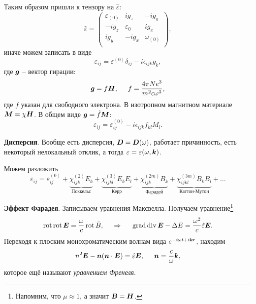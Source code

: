 Таким образом пришли к тензору на $\hat{\varepsilon}$:
\begin{equation*}
    \hat{\varepsilon} = \begin{pmatrix}
        \varepsilon_{(0)}  & i g_z & -i g_y \\
        -i g_z & \varepsilon_0 & i g_x \\
        i g_y & - i g_x & \omega_{(0)} \\
    \end{pmatrix},
\end{equation*}
иначе можем записать в виде
\begin{equation*}
    \varepsilon_{ij} = \varepsilon^{(0)} \delta_{ij} -i \epsilon_{ijk} g_k,
\end{equation*}
где $\mbox{\boldmath $g$}$ -- вектор гирации:
\begin{equation*}
    \mbox{\boldmath $g$} = f \mbox{\boldmath $H$},
    \hspace{5 mm} 
    f = \frac{4 \pi N e^3}{m^2 c \omega^3},
\end{equation*}
где $f$ указан для свободного электрона. 
В изотропном магнитном материале $\mbox{\boldmath $M$} = \chi \mbox{\boldmath $H$}$.
В общем виде $\mbox{\boldmath $g$} = \hat{f} \mbox{\boldmath $M$}$:
\begin{equation*}
    \varepsilon_{ij} = \varepsilon_{ij}^{(0)} - i \epsilon_{ijk} f_{kl} M_l.
\end{equation*}

\textbf{Дисперсия}. Вообще есть дисперсия, $\mbox{\boldmath $D$} = \mbox{\boldmath $D$}(\omega)$, работает причинность, есть некоторый нелокальный отклик, а тогда
$\varepsilon = \varepsilon(\omega, \mbox{\boldmath $k$})$. 

Можем разложить
\begin{equation*}
    \varepsilon_{ij} = 
    \varepsilon_{ij}^{(0)} + 
    \underbrace{\chi_{ijk}^{(2)} E_k}_{\text{Поккельс}} +
    \underbrace{\chi^{(3)}_{ijkl} E_k E_l}_{\text{Керр}} + 
    \underbrace{\chi^{(2m)}_{ijk} B_k}_{\text{Фарадей}} + 
    \underbrace{\chi_{ijkl}^{(3m)} B_k B_l}_{\text{Каттон-Мутон}} + \ldots
\end{equation*}








\textbf{Эффект Фарадея}. Записываем уравнения Максвелла. Получаем уравнение\footnote{
    Напомним, что $\mu \approx 1$, а значит $\mbox{\boldmath $B$} = \mbox{\boldmath $H$}$.
}
\begin{equation*}
\mathop{\mathrm{rot}}\nolimits \mathop{\mathrm{rot}}\nolimits \mbox{\boldmath $E$} = \frac{\omega}{c} \mathop{\mathrm{rot}}\nolimits \bar{B},
\hspace{0.5cm} \Rightarrow \hspace{0.5cm}
    \mathop{\mathrm{grad}}\nolimits \mathop{\mathrm{div}}\nolimits \mbox{\boldmath $E$} - \Delta E = \frac{\omega^2}{c} \hat{\varepsilon} \mbox{\boldmath $E$}.
\end{equation*}
Переходя к плоским монохроматическим волнам вида $e^{- i \omega t + i \smallvc{k} \smallvc{r}}$, находим
\begin{equation*}
    n^2 \mbox{\boldmath $E$} - \mbox{\boldmath $n$} (\mbox{\boldmath $n$} \cdot \mbox{\boldmath $E$})  = \hat{\varepsilon} \mbox{\boldmath $E$},
    \hspace{5 mm} 
    \mbox{\boldmath $n$} = \frac{c}{\omega} \mbox{\boldmath $k$},
\end{equation*}
которое ещё называют \textit{уравнением Френеля}.


